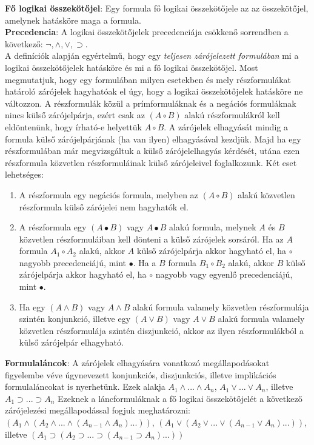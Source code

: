 \documentclass[margin=0px]{article}
\begin{document}
	\noindent \textbf{Fő logikai összekötőjel}: Egy formula fő logikai összekötőjele az az összekötőjel, amelynek
	hatásköre maga a formula.\\
	
	\noindent \textbf{Precedencia}: A logikai összekötőjelek precedenciája csökkenő sorrendben a következő: $\neg, \wedge, \vee, \supset$.\\
	
	A definíciók alapján egyértelmű, hogy egy \textit{teljesen zárójelezett formulában} mi a logikai összekötőjelek hatásköre és mi a fő
	logikai összekötőjel. Most megmutatjuk, hogy egy formulában milyen esetekben és mely részformulákat határoló zárójelek hagyhatóak el úgy, hogy a logikai összekötőjelek hatásköre ne változzon. A részformulák közül a prímformuláknak és a negációs formuláknak nincs külső zárójelpárja, ezért csak az $(A \circ B)$ alakú részformulákról kell eldöntenünk, hogy írható-e helyettük $A \circ B$. A zárójelek elhagyását
	mindig a formula külső zárójelpárjának (ha van ilyen) elhagyásával kezdjük. Majd ha egy részformulában már megvizsgáltuk a külső zárójelelhagyás kérdését, utána ezen részformula közvetlen részformuláinak külső zárójeleivel foglalkozunk. Két eset lehetséges:
	
	\begin{enumerate}
		\item	A részformula egy negációs formula, melyben az $(A \circ B)$ alakú közvetlen részformula külső zárójelei nem hagyhatók el.
		
		\item	A részformula egy $(A \bullet B)$ vagy $A \bullet B$ alakú formula, melynek $A$ és $B$ közvetlen részformuláiban kell dönteni a külső zárójelek sorsáról. Ha az $A$ formula $A_{1} \circ A_{2}$ alakú, akkor $A$ külső zárójelpárja akkor hagyható el, ha $\circ$ nagyobb precedenciájú, mint $\bullet$. Ha a $B$ formula $B_{1} \circ B_{2}$ alakú, akkor $B$ külső zárójelpárja akkor hagyható el, ha $\circ$ nagyobb vagy egyenlő precedenciájú, mint $\bullet$.
		
		\item	Ha egy $(A \wedge B)$ vagy $A \wedge B$ alakú formula valamely közvetlen részformulája szintén konjunkció, illetve egy
		$(A \vee B)$ vagy $A \vee B$ alakú formula valamely közvetlen részformulája szintén diszjunkció, akkor az ilyen részformulákból a külső zárójelpár elhagyható. 
	\end{enumerate}
	
	\noindent \textbf{Formulaláncok}: A zárójelek elhagyására vonatkozó megállapodásokat figyelembe véve úgynevezett konjunkciós, diszjunkciós, illetve implikációs formulaláncokat is nyerhetünk. Ezek alakja $A_{1} \wedge ... \wedge A_{n}$, $A_{1} \vee ... \vee A_{n}$, illetve
	$A_{1} \supset ... \supset A_{n}$ Ezeknek a láncformuláknak a fő logikai összekötőjelét a következő zárójelezési megállapodással fogjuk meghatározni: $(A_{1} \wedge (A_{2} \wedge ... \wedge (A_{n-1} \wedge A_{n})...))$, $(A_{1} \vee (A_{2} \vee ... \vee (A_{n-1} \vee A_{n})...))$, illetve $(A_{1} \supset (A_{2} \supset ... \supset (A_{n-1} \supset A_{n})...))$
	
\end{document}
